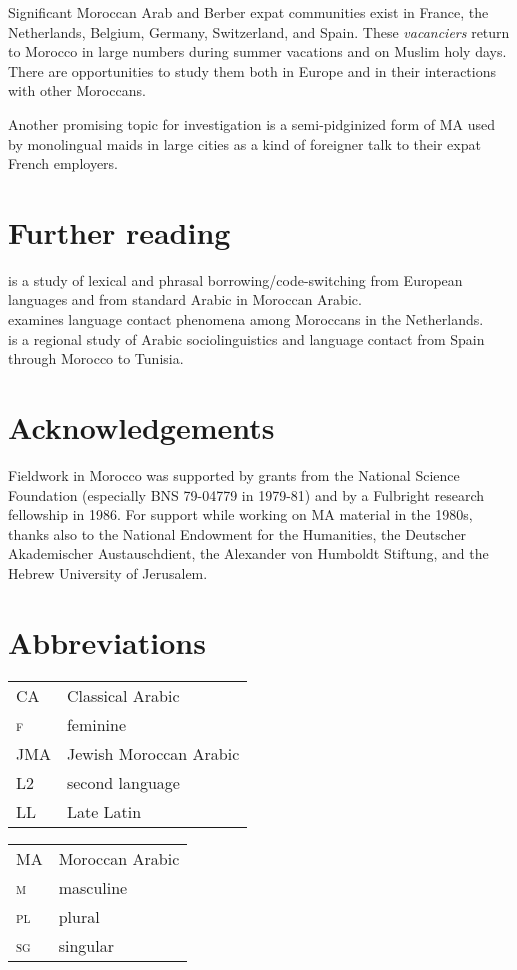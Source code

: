 \documentclass[output=paper]{langsci/langscibook}
\begin{document}
Significant Moroccan Arab and Berber expat communities exist in France, the Netherlands, Belgium, Germany, Switzerland, and Spain. These \textit{vacanciers} return to Morocco in large numbers during summer vacations and on Muslim holy days. There are opportunities to study them both in Europe \citep{Nortier1990} and in their interactions with other Moroccans. 

Another promising topic for investigation is a semi-pidginized form of MA used by monolingual maids in large cities as a kind of foreigner talk to their expat French employers.

\section*{Further reading}

\citet{Heath1989} is a study of lexical and phrasal borrowing/code-switching from European languages and from standard Arabic in Moroccan Arabic.\\
\citet{Nortier1990} examines language contact phenomena among Moroccans in the Netherlands.\\
\citet{Sayahi2014} is a regional study of Arabic sociolinguistics and language contact from Spain through Morocco to Tunisia.

\section*{Acknowledgements}

Fieldwork in Morocco was supported by grants from the National Science Foundation (especially BNS 79-04779 in 1979-81) and by a Fulbright research fellowship in 1986. For support while working on MA material in the 1980s, thanks also to the National Endowment for the Humanities, the Deutscher Akademischer Austauschdient, the Alexander von Humboldt Stiftung, and the Hebrew University of Jerusalem.

\section*{Abbreviations}
\begin{tabularx}{.5\textwidth}{@{}lQ@{}}
CA          & Classical Arabic\\
\textsc{f}  & feminine\\
JMA         & Jewish Moroccan Arabic\\
L2          & second language \\
LL          & Late Latin\\
\end{tabularx}%
\begin{tabularx}{.5\textwidth}{@{}lQ@{}}
MA          & Moroccan Arabic\\
\textsc{m}  & masculine\\
\textsc{pl} & plural\\
\textsc{sg} & singular
\end{tabularx}%


 
{\sloppy\printbibliography[heading=subbibliography,notkeyword=this]}
\end{document}
